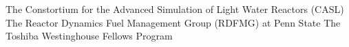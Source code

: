 
The Constortium for the Advanced Simulation of Light Water Reactors (CASL)
The Reactor Dynamics Fuel Management Group (RDFMG) at Penn State
The Toshiba Westinghouse Fellows Program

